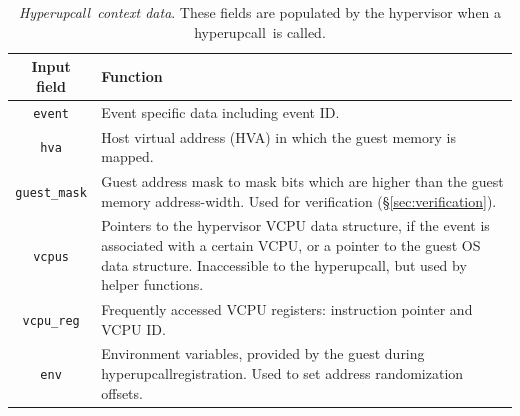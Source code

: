 \documentclass[11pt]{article}
\newcommand{\Hypercallback}{Hyperupcall\xspace{}}
\newcommand{\hypercallback}{hyperupcall\xspace{}}
\newcommand{\hide}[1]{}
\begin{document}
\begin{table}[t!]
 \centering
 \small
 \begin{tabularx}{\columnwidth}{c|X}
 \textbf{Input field} & \textbf{Function} \\
 \hline
 \texttt{event} & Event specific data including event ID. \\
 \texttt{hva} & Host virtual address (HVA) in which the guest memory is mapped. \\
 \texttt{guest\_mask} & Guest address mask to mask bits which are higher than
	the guest memory address-width. Used for verification (\S\ref{sec:verification}).\\
 \texttt{vcpus} & Pointers to the hypervisor VCPU data structure, if
	the event is associated with a certain VCPU, or a pointer
	to the guest OS data structure. Inaccessible to the
	hyperupcall, but used by helper functions.\\
 \texttt{vcpu\_reg} & Frequently accessed VCPU registers: instruction pointer and VCPU ID. \\
 \texttt{env} & Environment variables, provided by the guest
	during \hypercallback registration. Used to set address randomization offsets. \\
 \end{tabularx}
 \caption{\emph{\Hypercallback~context data}. These fields are populated by the hypervisor when a \hypercallback~is called.}
\label{table:context}
 \end{table}
 
\hide{
\begin{figure}[!t]
\begin{lstlisting}[basicstyle=\scriptsize\ttfamily,language=C,                keywordstyle=\color{blue}\ttfamily,
                stringstyle=\color{red}\ttfamily,
                commentstyle= \color{ForestGreen}\ttfamily]
int is_page_free(struct hcb_page __host *hp)
{
     unsigned long gfn = hdp->gpa >> PAGE_SHIFT;
     struct page *page = pfn_to_page(gfn);
     unsigned int order;
 
#pragma unroll
     for (order = 0; order < MAX_ORDER; order++) {
          struct page *page_head = 
             page - (pfn & ((1 << order) - 1));
 
          if (PageBuddy(page_head) 
          	 && page_order(page_head) >= order)
                  break;
     }
     return order < MAX_ORDER;
}
\end{lstlisting}
  \caption{\emph{Page free \hypercallback.} This Linux \hypercallback~checks if a VM OS page is free.
  All functions used, such as \texttt{pfn\_to\_page} and \texttt{PageBuddy} are Linux kernel functions.}
\label{fig:bpf_example}
\end{figure}
}
\end{document}
